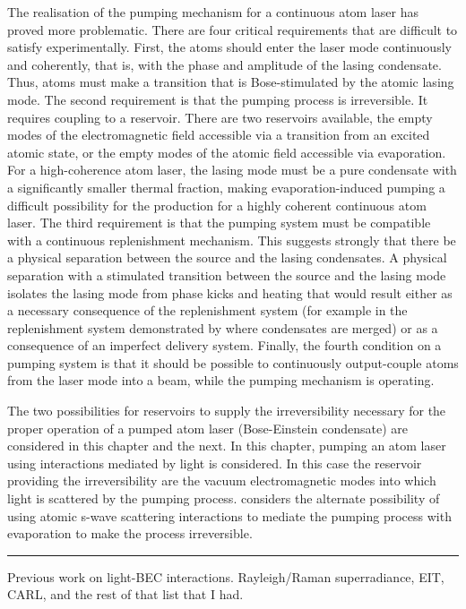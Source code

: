 The realisation of the pumping mechanism for a continuous atom laser has proved more problematic. There are four critical requirements that are difficult to satisfy experimentally. First, the atoms should enter the laser mode continuously and coherently, that is, with the phase and amplitude of the lasing condensate. Thus, atoms must make a transition that is Bose-stimulated by the atomic lasing mode. The second requirement is that the pumping process is irreversible. It requires coupling to a reservoir. There are two reservoirs available, the empty modes of the electromagnetic field accessible via a transition from an excited atomic state, or the empty modes of the atomic field accessible via evaporation. For a high-coherence atom laser, the lasing mode must be a pure condensate with a significantly smaller thermal fraction, making evaporation-induced pumping a difficult possibility for the production for a highly coherent continuous atom laser. The third requirement is that the pumping system must be compatible with a continuous replenishment mechanism. This suggests strongly that there be a physical separation between the source and the lasing condensates. A physical separation with a stimulated transition between the source and the lasing mode isolates the lasing mode from phase kicks and heating that would result either as a necessary consequence of the replenishment system (for example in the replenishment system demonstrated by \citet{Chikkatur:2002qa} where condensates are merged) or as a consequence of an imperfect delivery system. Finally, the fourth condition on a pumping system is that it should be possible to continuously output-couple atoms from the laser mode into a beam, while the pumping mechanism is operating.

The two possibilities for reservoirs to supply the irreversibility necessary for the proper operation of a pumped atom laser (Bose-Einstein condensate) are considered in this chapter and the next. In this chapter, pumping an atom laser using interactions mediated by light is considered. In this case the reservoir providing the irreversibility are the vacuum electromagnetic modes into which light is scattered by the pumping process.  considers the alternate possibility of using atomic s-wave scattering interactions to mediate the pumping process with evaporation to make the process irreversible.

\hrule

Previous work on light-BEC interactions. Rayleigh/Raman superradiance, EIT, CARL, and the rest of that list that I had.


